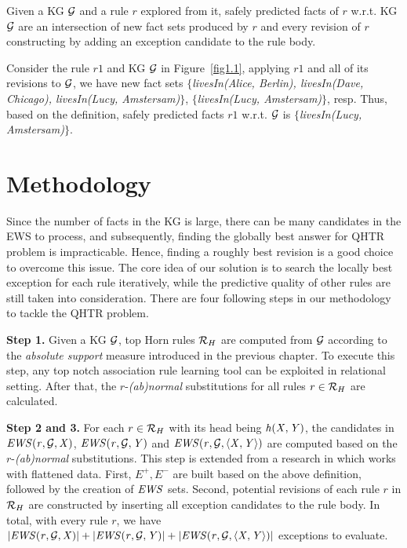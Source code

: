 \begin{definition}
Given a KG $\mathcal{G}$ and a rule $r$ explored from it, safely predicted facts of $r$ w.r.t. KG $\mathcal{G}$ are an intersection of new fact sets produced by $r$ and every revision of $r$ constructing by adding an exception candidate to the rule body.
\end{definition}

\begin{example}
Consider the rule $r1$ and KG $\mathcal{G}$ in Figure~\ref{fig1.1}, applying $r1$ and all of its revisions to $\mathcal{G}$, we have new fact sets \textit{$\{$livesIn(Alice, Berlin), livesIn(Dave, Chicago), livesIn(Lucy, Amstersam)$\}$}, \textit{$\{$livesIn(Lucy, Amstersam)$\}$}, resp. Thus, based on the definition, safely predicted facts $r1$ w.r.t. $\mathcal{G}$ is \textit{$\{$livesIn(Lucy, Amstersam)$\}$}.
\end{example}

\section{Methodology}\label{sec:meth}

Since the number of facts in the KG is large, there can be many candidates in the EWS to process, and subsequently, finding the globally best answer for QHTR problem is impracticable. Hence, finding a roughly best revision is a good choice to overcome this issue. The core idea of our solution is to search the locally best exception for each rule iteratively, while the predictive quality of other rules are still taken into consideration. There are four following steps in our methodology to tackle the QHTR problem.
\medskip

\noindent \textbf{Step 1.} Given a KG $\mathcal{G}$, top Horn rules $\mathcal{R}_H$ are computed from $\mathcal{G}$ according to the \textit{absolute support} measure introduced in the previous chapter. To execute this step, any top notch association rule learning tool can be exploited in relational setting. After that, the $r$-\emph{(ab)normal} substitutions for all rules $r\in \mathcal{R}_H$ are calculated.
\smallskip

\noindent \textbf{Step 2 and 3.} For each $r\in \mathcal{R}_H$ with its head being $\mathit{h(X,Y)}$, the candidates in $\mathit{EWS(r,\mathcal{G},X)}$, $\mathit{EWS(r,\mathcal{G},Y)}$ and $\mathit{EWS(r,\mathcal{G},\langle X,Y\rangle)}$ are computed based on the $r$-\emph{(ab)normal} substitutions. This step is extended from a research in \cite{iswc2016} which works with flattened data. First, $E^+, E^-$ are built based on the above definition, followed by the creation of $\mathit{EWS}$ sets. Second, potential revisions of each rule $r$ in $\mathcal{R}_H$ are constructed by inserting all exception candidates to the rule body. In total, with every rule $r$, we have $|\mathit{EWS(r,\mathcal{G},X)}|+|\mathit{EWS(r,\mathcal{G},Y)}|+|\mathit{EWS(r,\mathcal{G},\langle X,Y\rangle)}|$ exceptions to evaluate.

